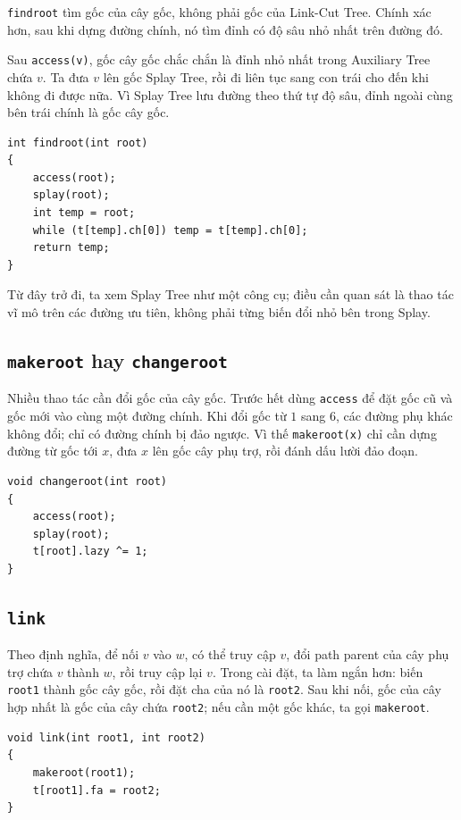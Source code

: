 \documentclass[11pt]{article}
\begin{document}
\texttt{findroot} tìm gốc của cây gốc, không phải gốc của Link-Cut Tree.  Chính
xác hơn, sau khi dựng đường chính, nó tìm đỉnh có độ sâu nhỏ nhất trên đường
đó.

Sau \texttt{access(v)}, gốc cây gốc chắc chắn là đỉnh nhỏ nhất trong
Auxiliary Tree chứa $v$.  Ta đưa $v$ lên gốc Splay Tree, rồi đi liên tục sang
con trái cho đến khi không đi được nữa.  Vì Splay Tree lưu đường theo thứ tự
độ sâu, đỉnh ngoài cùng bên trái chính là gốc cây gốc.

\begingroup
\small
\begin{verbatim}
int findroot(int root)
{
    access(root);
    splay(root);
    int temp = root;
    while (t[temp].ch[0]) temp = t[temp].ch[0];
    return temp;
}
\end{verbatim}
\endgroup

Từ đây trở đi, ta xem Splay Tree như một công cụ; điều cần quan sát là thao tác
vĩ mô trên các đường ưu tiên, không phải từng biến đổi nhỏ bên trong Splay.

\subsection{\texttt{makeroot} hay \texttt{changeroot}}

Nhiều thao tác cần đổi gốc của cây gốc.  Trước hết dùng \texttt{access} để đặt
gốc cũ và gốc mới vào cùng một đường chính.  Khi đổi gốc từ $1$ sang $6$,
các đường phụ khác không đổi; chỉ có đường chính bị đảo ngược.  Vì thế
\texttt{makeroot(x)} chỉ cần dựng đường từ gốc tới $x$, đưa $x$ lên gốc cây
phụ trợ, rồi đánh dấu lười đảo đoạn.

\begingroup
\small
\begin{verbatim}
void changeroot(int root)
{
    access(root);
    splay(root);
    t[root].lazy ^= 1;
}
\end{verbatim}
\endgroup

\subsection{\texttt{link}}

Theo định nghĩa, để nối $v$ vào $w$, có thể truy cập $v$, đổi path parent của
cây phụ trợ chứa $v$ thành $w$, rồi truy cập lại $v$.  Trong cài đặt, ta làm
ngắn hơn: biến \texttt{root1} thành gốc cây gốc, rồi đặt cha của nó là
\texttt{root2}.  Sau khi nối, gốc của cây hợp nhất là gốc của cây chứa
\texttt{root2}; nếu cần một gốc khác, ta gọi \texttt{makeroot}.

\begingroup
\small
\begin{verbatim}
void link(int root1, int root2)
{
    makeroot(root1);
    t[root1].fa = root2;
}
\end{verbatim}
\endgroup
\end{document}
